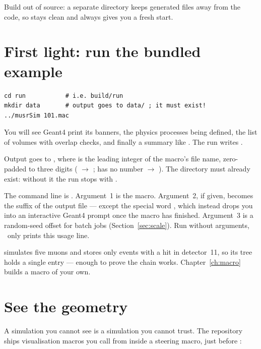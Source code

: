 \begin{tip}
Build out of source: a separate  directory keeps generated files away from the code, so  stays clean and  always gives you a fresh start.
\end{tip}

\section{First light: run the bundled example}
\begin{lstlisting}[style=sh,caption={Run your first simulation}]
cd run           # i.e. build/run
mkdir data       # output goes to data/ ; it must exist!
../musrSim 101.mac
\end{lstlisting}

You will see Geant4 print its banners, the physics processes being defined, the list of volumes with overlap checks, and finally a summary like . The run writes .

\begin{keypoint}
Output goes to , where  is the leading integer of the macro's file name, zero-padded to three digits ( \(\rightarrow\) ;  has no number \(\rightarrow\) ). The  directory must already exist: without it the run stops with .
\end{keypoint}

\begin{hood}
The command line is . Argument~1 is the macro. Argument~2, if given, becomes the  suffix of the output file --- except the special word , which instead drops you into an interactive Geant4 prompt once the macro has finished. Argument~3 is a random-seed offset for batch jobs (Section~\ref{sec:scale}). Run without arguments, \musrSim\ only prints this usage line.
\end{hood}

 simulates five muons and stores only events with a hit in detector~11, so its tree holds a single entry --- enough to prove the chain works. Chapter~\ref{ch:macro} builds a macro of your own.

\section{See the geometry}
A simulation you cannot see is a simulation you cannot trust. The repository ships visualisation macros you call from inside a steering macro, just before :


